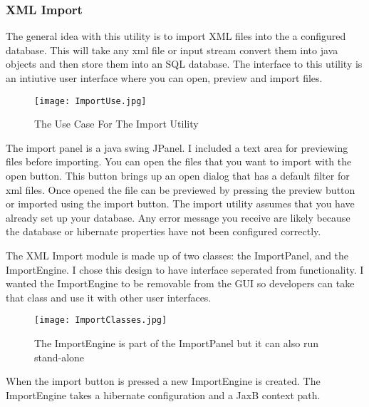 \subsubsection{XML Import}
\par
The general idea with this utility is to import XML files into the a configured database. This will take any xml file or input stream convert them into java objects and then store them into an SQL database. The interface to this utility is an intiutive user interface where you can open, preview and import files. 

\begin{figure}[h]
	\centering
		\texttt{[image: ImportUse.jpg]}
	\caption{The Use Case For The Import Utility}
	\label{fig:Import Use}
\end{figure}
\par
The import panel is a java swing JPanel. I included a text area for previewing files before importing. You can open the files that you want to import with the open button. This button brings up an open dialog that has a default filter for xml files. Once opened the file can be previewed by pressing the preview button or imported using the import button. The import utility assumes that you have already set up your database. Any error message you receive are likely because the database or hibernate properties have not been configured correctly. 


\par
The XML Import module is made up of two classes: the ImportPanel, and the ImportEngine. I chose this design to have interface seperated from functionality. I wanted the ImportEngine to be removable from the GUI so developers can take that class and use it with other user interfaces. 

\begin{figure}[h]
	\centering
		\texttt{[image: ImportClasses.jpg]}
	\caption{The ImportEngine is part of the ImportPanel but it can also run stand-alone}
	\label{fig:ImportClasses}
\end{figure}

When the import button is pressed a new ImportEngine is created. The ImportEngine takes a hibernate configuration and a JaxB context path. 

